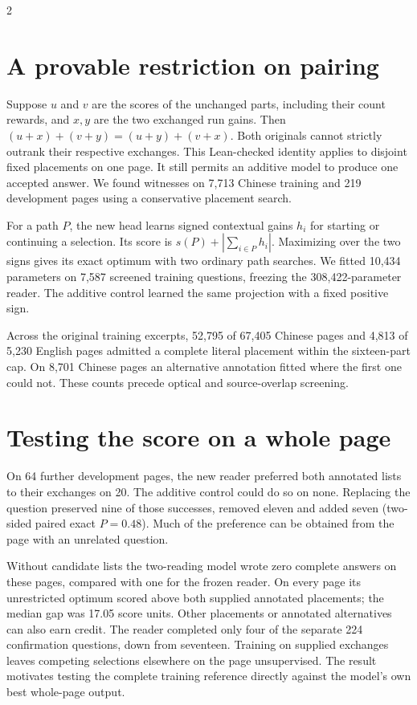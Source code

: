 \documentclass[10pt,a4paper]{article}
\begin{document}
\begin{multicols}{2}
\section*{A provable restriction on pairing}
Suppose $u$ and $v$ are the scores of the unchanged parts, including their count rewards, and $x,y$ are the two exchanged run gains. Then $(u+x)+(v+y)=(u+y)+(v+x)$. Both originals cannot strictly outrank their respective exchanges. This Lean-checked identity applies to disjoint fixed placements on one page. It still permits an additive model to produce one accepted answer. We found witnesses on 7,713 Chinese training and 219 development pages using a conservative placement search.
\par For a path $P$, the new head learns signed contextual gains $h_i$ for starting or continuing a selection. Its score is $s(P)+|\sum_{i\in P}h_i|$. Maximizing over the two signs gives its exact optimum with two ordinary path searches. We fitted 10,434 parameters on 7,587 screened training questions, freezing the 308,422-parameter reader. The additive control learned the same projection with a fixed positive sign.
\par Across the original training excerpts, 52,795 of 67,405 Chinese pages and 4,813 of 5,230 English pages admitted a complete literal placement within the sixteen-part cap. On 8,701 Chinese pages an alternative annotation fitted where the first one could not. These counts precede optical and source-overlap screening.
\columnbreak
\section*{Testing the score on a whole page}
On 64 further development pages, the new reader preferred both annotated lists to their exchanges on 20. The additive control could do so on none. Replacing the question preserved nine of those successes, removed eleven and added seven (two-sided paired exact $P=0.48$). Much of the preference can be obtained from the page with an unrelated question.
\par Without candidate lists the two-reading model wrote zero complete answers on these pages, compared with one for the frozen reader. On every page its unrestricted optimum scored above both supplied annotated placements; the median gap was 17.05 score units. Other placements or annotated alternatives can also earn credit. The reader completed only four of the separate 224 confirmation questions, down from seventeen. Training on supplied exchanges leaves competing selections elsewhere on the page unsupervised. The result motivates testing the complete training reference directly against the model's own best whole-page output.
\end{multicols}
\end{document}

